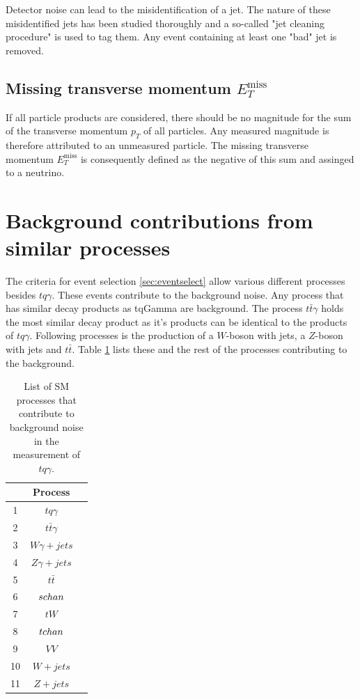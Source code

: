 Detector noise can lead to the misidentification of a jet. The nature of these misidentified jets has been studied thoroughly \cite{70} and a so-called "jet cleaning procedure" is used to tag them. 
Any event containing at least one "bad" jet is removed. 

\subsection{Missing transverse momentum \texorpdfstring{$E_T^{\text{miss}}$}{}}

If all particle products are considered, there should be no magnitude for the sum of the transverse momentum $p_T$ of all particles. 
Any measured magnitude is therefore attributed to an unmeasured particle. The missing transverse momentum $E_T^{\text{miss}}$ is consequently defined as the negative of this sum and assinged to a neutrino. 

\section{Background contributions from similar processes}



The criteria for event selection \ref{sec:eventselect} allow various different processes besides $tq\gamma$. These events contribute to the background noise. Any process that has similar decay products as tqGamma are background. 
The process $t\bar{t}\gamma$ holds the most similar decay product as it's products can be identical to the products of $tq\gamma$. Following processes is the production of a $W$-boson with jets, a $Z$-boson with jets and $t\bar{t}$. 
Table \ref{tab:background} lists these and the rest of the processes contributing to the background.
\begin{table}
    \centering
    \begin{tabular}{c c c}
        \toprule
        {} & Process \\
        \midrule
        1 & $tq\gamma$\\[.1cm]
        2 & $t\bar{t}\gamma$\\[.1cm]
        3 & $W\gamma + jets$\\[.1cm]
        4 & $Z\gamma + jets$\\[.1cm]
        5 & $t\bar{t}$\\[.1cm]
        6 & $s\-chan$\\[.1cm]
        7 & $t W$\\[.1cm]
        8 & $t\-chan$\\[.1cm]
        9 & $VV$\\[.1cm]
        10& $W+jets$\\[.1cm]
        11& $Z+jets$\\[.1cm]
        \bottomrule
    \end{tabular}
    \caption{List of SM processes that contribute to background noise in the measurement of $tq\gamma$.}
    \label{tab:background}
\end{table}





